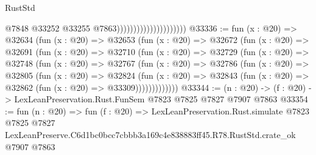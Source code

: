 \begin{lexlean}{RustStd}
\begin{coremodule}
                                              @7848
                                              @33252
                                              @33255
                                              @7863)))))))))))))))))))))
@33336 := fun (x : @20) =>
  @32634
    (fun (x : @20) =>
    @32653
      (fun (x : @20) =>
      @32672
        (fun (x : @20) =>
        @32691
          (fun (x : @20) =>
          @32710
            (fun (x : @20) =>
            @32729
              (fun (x : @20) =>
              @32748
                (fun (x : @20) =>
                @32767
                  (fun (x : @20) =>
                  @32786
                    (fun (x : @20) =>
                    @32805
                      (fun (x : @20) =>
                      @32824
                        (fun (x : @20) =>
                        @32843 (fun (x : @20) => @32862 (fun (x : @20) => @33309)))))))))))))
@33344 := (n : @20) -> (f : @20) -> LexLeanPreservation.Rust.FunSem @7823 @7825 @7827 @7907 @7863
@33354 := fun (n : @20) =>
  fun (f : @20) =>
  LexLeanPreservation.Rust.simulate
    @7823
    @7825
    @7827
    LexLeanPreserve.C6d1bc0bcc7cbbb3a169c4e838883ff45.R78.RustStd.crate_ok
    @7907
    @7863
\end{coremodule}
\end{lexlean}
